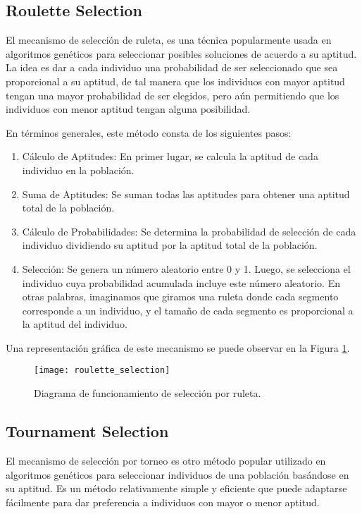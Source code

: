 \subsection{Roulette Selection}
El mecanismo de selección de ruleta, es una técnica popularmente usada en algoritmos genéticos para seleccionar posibles soluciones de acuerdo a su aptitud. La idea es dar a cada individuo una probabilidad de ser seleccionado que sea proporcional a su aptitud, de tal manera que los individuos con mayor aptitud tengan una mayor probabilidad de ser elegidos, pero aún permitiendo que los individuos con menor aptitud tengan alguna posibilidad.

En términos generales, este método consta de los siguientes pasos:

\begin{enumerate}
	\item Cálculo de Aptitudes: En primer lugar, se calcula la aptitud de cada individuo en la población.
	\item Suma de Aptitudes: Se suman todas las aptitudes para obtener una aptitud total de la población.
	\item Cálculo de Probabilidades: Se determina la probabilidad de selección de cada individuo dividiendo su aptitud por la aptitud total de la población.
	\item Selección: Se genera un número aleatorio entre 0 y 1. Luego, se selecciona el individuo cuya probabilidad acumulada incluye este número aleatorio. En otras palabras, imaginamos que giramos una ruleta donde cada segmento corresponde a un individuo, y el tamaño de cada segmento es proporcional a la aptitud del individuo.
\end{enumerate}

Una representación gráfica de este mecanismo se puede observar en la Figura \ref{fig:RS}.

\begin{figure}[htbp]
	\centering
	\texttt{[image: roulette\_selection]}
	\caption{Diagrama de funcionamiento de selección por ruleta.}
	\label{fig:RS}
\end{figure}


\subsection{Tournament Selection}
El mecanismo de selección por torneo es otro método popular utilizado en algoritmos genéticos para seleccionar individuos de una población basándose en su aptitud. Es un método relativamente simple y eficiente que puede adaptarse fácilmente para dar preferencia a individuos con mayor o menor aptitud.

